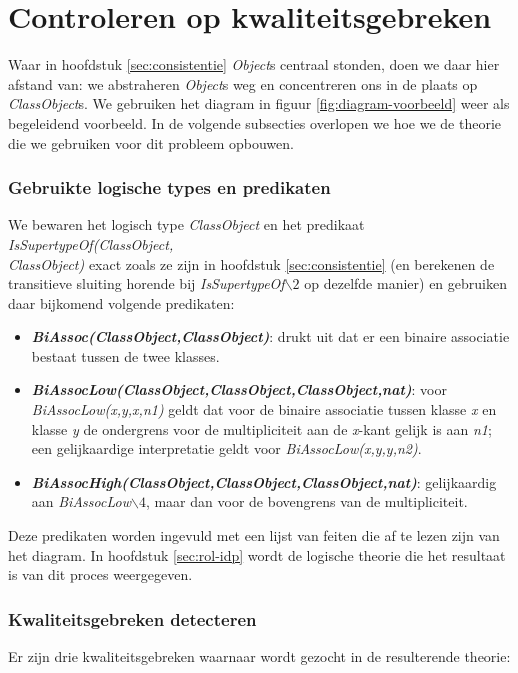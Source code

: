 \chapter{Controleren op kwaliteitsgebreken}\label{sec:kwaliteitsgebrek}
Waar in hoofdstuk \ref{sec:consistentie} \textit{Object}s centraal stonden, doen we daar hier afstand van: we abstraheren \textit{Object}s weg en concentreren ons in de plaats op \textit{ClassObject}s. We gebruiken het diagram in figuur \ref{fig:diagram-voorbeeld} weer als begeleidend voorbeeld. In de volgende subsecties overlopen we hoe we de theorie die we gebruiken voor dit probleem opbouwen.

\subsection{Gebruikte logische types en predikaten}
We bewaren het logisch type \textit{ClassObject} en het predikaat \textit{IsSupertypeOf(ClassObject,\\ClassObject)} exact zoals ze zijn in hoofdstuk \ref{sec:consistentie} (en berekenen de transitieve sluiting horende bij \textit{IsSupertypeOf$\backslash2$} op dezelfde manier) en gebruiken daar bijkomend volgende predikaten:

\begin{itemize}
	\item \textbf{\textit{BiAssoc(ClassObject,ClassObject)}}: drukt uit dat er een binaire associatie bestaat tussen de twee klasses.
	\item \textbf{\textit{BiAssocLow(ClassObject,ClassObject,ClassObject,nat)}}: voor \textit{BiAssocLow(x,y,x,n1)} geldt dat voor de binaire associatie tussen klasse \textit{x} en klasse \textit{y} de ondergrens voor de multipliciteit aan de \textit{x}-kant gelijk is aan \textit{n1}; een gelijkaardige interpretatie geldt voor \textit{BiAssocLow(x,y,y,n2)}.
	\item \textbf{\textit{BiAssocHigh(ClassObject,ClassObject,ClassObject,nat)}}: gelijkaardig aan \textit{BiAssocLow$\backslash4$}, maar dan voor de bovengrens van de multipliciteit.
\end{itemize}

Deze predikaten worden ingevuld met een lijst van feiten die af te lezen zijn van het diagram. In hoofdstuk \ref{sec:rol-idp} wordt de logische theorie die het resultaat is van dit proces weergegeven.

\subsection{Kwaliteitsgebreken detecteren}
Er zijn drie kwaliteitsgebreken waarnaar wordt gezocht in de resulterende theorie:


